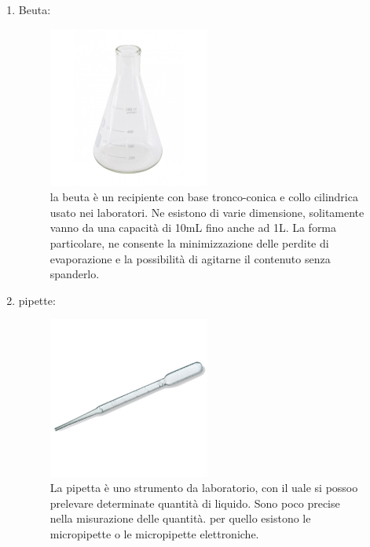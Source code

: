 \documentclass{article}
\begin{document}
\begin{enumerate}
\begin{figure}[H]
		\end{figure}

		\vspace{0.5cm}


		\item Beuta:

		\begin{figure}[H]

			\includegraphics[width=0.5\textwidth]{./immagini/beuta.jpg}
			\caption{la beuta è un recipiente con base tronco-conica e collo cilindrica usato nei laboratori.
			Ne esistono di varie dimensione, solitamente vanno da una capacità di 10mL fino anche ad 1L.
			La forma particolare, ne consente la minimizzazione delle perdite di evaporazione e la possibilità
			di agitarne il contenuto senza spanderlo.}
			\label{beuta}

		\end{figure}

		\vspace{0.5cm}


		\item pipette:

		\begin{figure}[H]

			\includegraphics[width=0.5\textwidth]{./immagini/pipetta.jpg}
			\caption{La pipetta è uno strumento da laboratorio, con il uale si possoo prelevare determinate quantità di liquido. Sono poco precise nella misurazione delle quantità. per quello esistono le micropipette o le micropipette elettroniche.}
			\label{pipetta}


\end{figure}
\end{enumerate}
\end{document}
